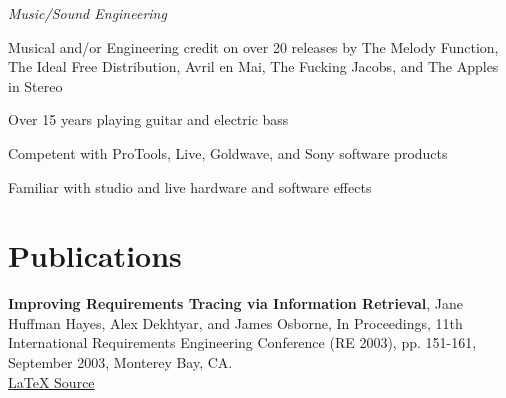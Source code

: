 \documentclass[margin,line]{resume}
\begin{document}
\begin{resume}
    \textsl{Music/Sound Engineering}\vspace{-4mm}\\%
    \begin{list2}
        \item Musical and/or Engineering credit on over 20 releases by The Melody Function, The Ideal Free Distribution, 
              Avril en Mai, The Fucking Jacobs, and The Apples in Stereo
        \item Over 15 years playing guitar and electric bass
        \item Competent with ProTools, Live, Goldwave, and Sony software products
        \item Familiar with studio and live hardware and software effects
    \end{list2}

    \section{\mysidestyle Publications}
    \textbf{Improving Requirements Tracing via Information Retrieval}, Jane Huffman Hayes, Alex Dekhtyar, and James Osborne,
    In Proceedings, 11th International Requirements Engineering Conference (RE 2003), pp. 151-161, 
    September 2003, Monterey Bay, CA.\vspace{-3mm}\\%

    \hfill \href{http://lexvegas.org/resume.tgz}{\LaTeX{} Source}
\end{resume}
\end{document}
